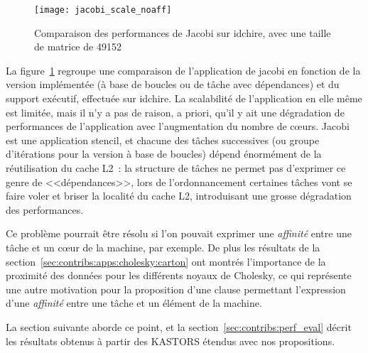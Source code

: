 \begin{figure}[ht]
  \centering
  \texttt{[image: jacobi\_scale\_noaff]}
  \caption{Comparaison des performances de Jacobi sur idchire, avec une taille de matrice de 49152}\label{fig:contribs:openmp:kastors:jacobi-motiv}
\end{figure}

La figure~\ref{fig:contribs:openmp:kastors:jacobi-motiv} regroupe une comparaison de l'application de jacobi en fonction de la version implémentée (à base de boucles ou de tâche avec dépendances) et du support exécutif, effectuée sur idchire.
La scalabilité de l'application en elle même est limitée, mais il n'y a pas de raison, a priori, qu'il y ait une dégradation de performances de l'application avec l'augmentation du nombre de cœurs.
Jacobi est une application stencil, et chacune des tâches successives (ou groupe d'itérations pour la version à base de boucles) dépend énormément de la réutilisation du cache L2~: la structure de tâches ne permet pas d'exprimer ce genre de <<dépendances>>, lors de l'ordonnancement certaines tâches vont se faire voler et briser la localité du cache L2, introduisant une grosse dégradation des performances.

Ce problème pourrait être résolu si l'on pouvait exprimer une \emph{affinité} entre une tâche et un cœur de la machine, par exemple.
De plus les résultats de la section~\ref{sec:contribs:apps:cholesky:carton} ont montrés l'importance de la proximité des données pour les différents noyaux de Cholesky, ce qui représente une autre motivation pour la proposition d'une clause permettant l'expression d'une \emph{affinité} entre une tâche et un élément de la machine.

La section suivante aborde ce point, et la section~\ref{sec:contribs:perf_eval} décrit les résultats obtenus à partir des KASTORS étendus avec nos propositions.

